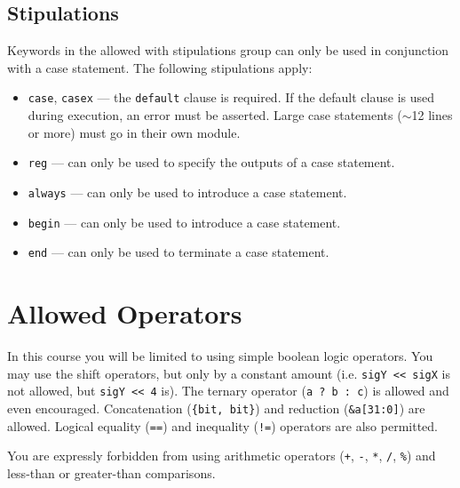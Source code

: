 \documentclass[11pt]{article}
\begin{document}
\vspace{1.0em}

\subsection*{Stipulations}

Keywords in the allowed with stipulations group can only be used in conjunction with a case statement.
The following stipulations apply:
\begin{itemize}
  \item \texttt{case}, \texttt{casex} — the \texttt{default} clause is required. If the default clause is used during
        execution, an error must be asserted. Large case statements (\(\sim\)12 lines or more) must go in their own module.
  \item \texttt{reg} — can only be used to specify the outputs of a case statement.
  \item \texttt{always} — can only be used to introduce a case statement.
  \item \texttt{begin} — can only be used to introduce a case statement.
  \item \texttt{end} — can only be used to terminate a case statement.
\end{itemize}

\section{Allowed Operators}

In this course you will be limited to using simple boolean logic operators. You may use the shift operators,
but only by a constant amount (i.e. \texttt{sigY << sigX} is not allowed, but \texttt{sigY << 4} is).
The ternary operator (\texttt{a ? b : c}) is allowed and even encouraged.
Concatenation (\texttt{\{bit, bit\}}) and reduction (\texttt{\&a[31:0]}) are allowed.
Logical equality (\texttt{==}) and inequality (\texttt{!=}) operators are also permitted.

You are expressly forbidden from using arithmetic operators (\texttt{+}, \texttt{-}, \texttt{*}, \texttt{/}, \texttt{\%})
and less-than or greater-than comparisons.
\end{document}
